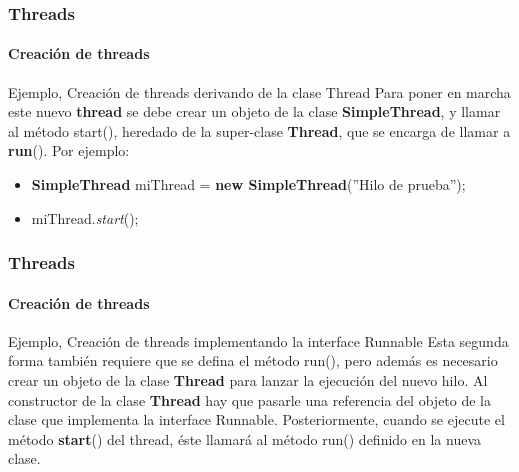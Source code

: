 \documentclass{beamer}
\begin{document}
	\begin{frame}
		\frametitle{Threads}
		\framesubtitle{Creaci\'on de threads}

        \begin{block}{Ejemplo, Creaci\'on de threads derivando de la clase Thread}
            Para poner en marcha este nuevo \textbf{thread} se debe crear un objeto de la clase \textbf{SimpleThread}, y llamar al m\'etodo start(), heredado de la super-clase \textbf{Thread}, que se encarga de llamar a \textbf{run}(). Por ejemplo:
            \begin{itemize}
                \item[] \textbf{SimpleThread} miThread = \textbf{new SimpleThread}(''Hilo de prueba'');
                \item[] miThread.\emph{start}();
            \end{itemize}
        \end{block}
	\end{frame}		
	
	\begin{frame}
		\frametitle{Threads}
		\framesubtitle{Creaci\'on de threads}

		\begin{block}{Ejemplo, Creaci\'on de threads implementando la interface Runnable}
            Esta segunda forma tambi\'en requiere que se defina el m\'etodo run(), pero adem\'as es necesario crear un objeto de la clase \textbf{Thread} para lanzar la ejecuci\'on del nuevo hilo. Al constructor de la clase \textbf{Thread} hay que pasarle una referencia del objeto de la clase que implementa la interface Runnable. Posteriormente, cuando se ejecute el m\'etodo \textbf{start}() del thread, \'este llamar\'a al m\'etodo run() definido en la nueva clase.
        \end{block}
	\end{frame}
\end{document}
